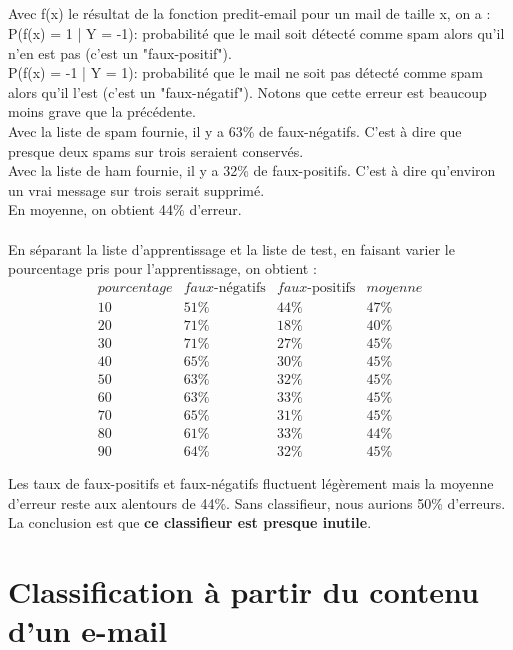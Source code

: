 \documentclass[a4paper]{article}
\begin{document}
\subsection{}
\begin{minipage}{\textwidth}
Avec f(x) le résultat de la fonction predit-email pour un mail de taille x, on a :\\
P(f(x) = 1 | Y = -1): probabilité que le mail soit détecté comme spam alors qu'il n'en est pas (c'est un "faux-positif").\\
P(f(x) = -1 | Y = 1): probabilité que le mail ne soit pas détecté comme spam alors qu'il l'est (c'est un "faux-négatif"). Notons que cette erreur est beaucoup moins grave que la précédente.\\
Avec la liste de spam fournie, il y a 63\% de faux-négatifs. C'est à dire que presque deux spams sur trois seraient conservés.\\
Avec la liste de ham fournie, il y a 32\% de faux-positifs. C'est à dire qu'environ un vrai message sur trois serait supprimé.\\
En moyenne, on obtient 44\% d'erreur.\\\\
En séparant la liste d'apprentissage et la liste de test, en faisant varier le pourcentage pris pour l'apprentissage, on obtient :
\[\begin{array}{cccc}
pourcentage & faux\text{-négatifs} & faux\text{-positifs} & moyenne\\
10 & 51\% & 44\% & 47\%\\
20 & 71\% & 18\% & 40\%\\
30 & 71\% & 27\% & 45\%\\
40 & 65\% & 30\% & 45\%\\
50 & 63\% & 32\% & 45\%\\
60 & 63\% & 33\% & 45\%\\
70 & 65\% & 31\% & 45\%\\
80 & 61\% & 33\% & 44\%\\
90 & 64\% & 32\% & 45\%
\end{array}\]

Les taux de faux-positifs et faux-négatifs fluctuent légèrement mais la moyenne d'erreur reste aux alentours de 44\%. Sans classifieur, nous aurions 50\% d'erreurs. La conclusion est que \textbf{ce classifieur est presque inutile}.
\end{minipage}

\newpage
\section{Classification à partir du contenu d'un e-mail}
\end{document}
